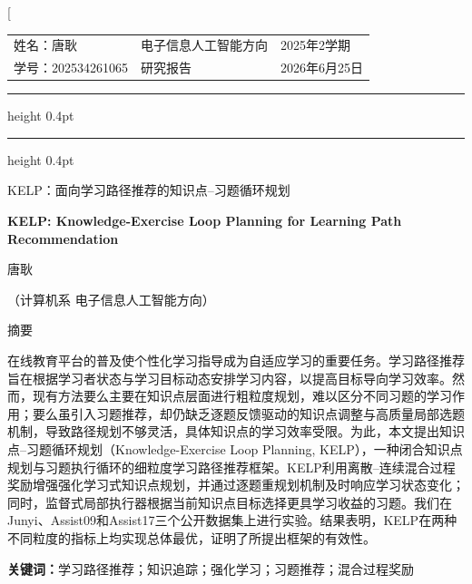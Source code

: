 \documentclass[UTF8,a4paper,zihao=5,twocolumn]{ctexart}
\makeatletter
\newcommand{\ReportName}{姓名：唐耿}
\newcommand{\ReportAuthorName}{唐耿}
\newcommand{\ReportMajor}{计算机系 电子信息人工智能方向}
\newcommand{\ReportStudentID}{学号：202534261065}
\newcommand{\ReportCourse}{电子信息人工智能方向}
\newcommand{\ReportType}{研究报告}
\newcommand{\ReportTerm}{2025年2学期}
\newcommand{\ReportDate}{2026年6月25日}
\newcommand{\makereportheader}{%
  {\songti\zihao{-5}
  \noindent
  \begin{tabular*}{\textwidth}{@{}p{0.28\textwidth}@{\extracolsep{\fill}}>{\centering\arraybackslash}p{0.32\textwidth}>{\raggedleft\arraybackslash}p{0.28\textwidth}@{}}
  \ReportName & \ReportCourse & \ReportTerm\\
  \ReportStudentID & \ReportType & \ReportDate
  \end{tabular*}\par
  \vspace{0.15em}
  \hrule height 0.4pt
  \vspace{0.08em}
  \hrule height 0.4pt
  \vspace{1.2em}}
}
\makeatother
\begin{document}
\twocolumn[{%
\makereportheader
\begin{center}
{\heiti{} KELP：面向学习路径推荐的知识点--习题循环规划\par}
\vspace{0.6em}
{\bfseries{} KELP: Knowledge-Exercise Loop Planning for Learning Path Recommendation\par}
\vspace{0.7em}
{\fangsong{} \ReportAuthorName\par}
\vspace{0.35em}
{\songti{} （\ReportMajor）\par}
\vspace{0.9em}
\end{center}

\begin{center}
{\heiti{} 摘\quad 要}
\end{center}
{\songti{}
在线教育平台的普及使个性化学习指导成为自适应学习的重要任务。学习路径推荐旨在根据学习者状态与学习目标动态安排学习内容，以提高目标导向学习效率。然而，现有方法要么主要在知识点层面进行粗粒度规划，难以区分不同习题的学习作用；要么虽引入习题推荐，却仍缺乏逐题反馈驱动的知识点调整与高质量局部选题机制，导致路径规划不够灵活，具体知识点的学习效率受限。为此，本文提出知识点--习题循环规划（Knowledge-Exercise Loop Planning, KELP），一种闭合知识点规划与习题执行循环的细粒度学习路径推荐框架。KELP利用离散--连续混合过程奖励增强强化学习式知识点规划，并通过逐题重规划机制及时响应学习状态变化；同时，监督式局部执行器根据当前知识点目标选择更具学习收益的习题。我们在Junyi、Assist09和Assist17三个公开数据集上进行实验。结果表明，KELP在两种不同粒度的指标上均实现总体最优，证明了所提出框架的有效性。
\par}
\vspace{0.5em}
{\songti{}\noindent\textbf{关键词：}学习路径推荐；知识追踪；强化学习；习题推荐；混合过程奖励}
\vspace{0.7em}

}
\end{document}
